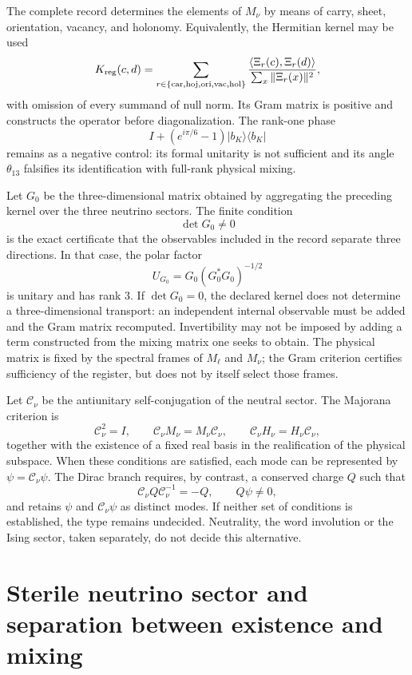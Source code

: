 The complete record determines the elements of \(M_\nu\) by means of carry,
sheet, orientation, vacancy, and holonomy. Equivalently, the
Hermitian kernel may be used
\[
 K_{\rm reg}(c,d)
 =\sum_{r\in\{\rm car,hoj,ori,vac,hol\}}
 \frac{\langle\Xi_r(c),\Xi_r(d)\rangle}
      {\sum_x\|\Xi_r(x)\|^2},
\]
with omission of every summand of null norm. Its Gram matrix is positive and
constructs the operator before diagonalization. The rank-one phase
\[
 I+(e^{i\pi/6}-1)|b_K\rangle\langle b_K|
\]
remains as a negative control: its formal unitarity is not sufficient and its angle
\(\theta_{13}\) falsifies its identification with full-rank physical
mixing.

Let \(G_0\) be the three-dimensional matrix obtained by aggregating the preceding kernel
over the three neutrino sectors. The finite condition
\[
 \det G_0\ne0
\]
is the exact certificate that the observables included in the record
separate three directions. In that case, the polar factor
\[
 U_{G_0}=G_0(G_0^*G_0)^{-1/2}
\]
is unitary and has rank \(3\). If \(\det G_0=0\), the declared kernel does not
determine a three-dimensional transport: an independent internal observable
must be added and the Gram matrix recomputed. Invertibility may not be
imposed by adding a term constructed from the mixing matrix one seeks to obtain.
The physical matrix is fixed by the spectral frames of \(M_\ell\) and
\(M_\nu\); the Gram criterion certifies sufficiency of the register, but does not
by itself select those frames.

Let \(\mathcal C_\nu\) be the antiunitary self-conjugation of the neutral sector. The
Majorana criterion is
\[
 \mathcal C_\nu^2=I,
 \qquad
 \mathcal C_\nu M_\nu=M_\nu\mathcal C_\nu,
 \qquad
 \mathcal C_\nu H_\nu=H_\nu\mathcal C_\nu,
\]
together with the existence of a fixed real basis in the realification of the
physical subspace. When these conditions are satisfied, each mode can be
represented by \(\psi=\mathcal C_\nu\psi\). The Dirac branch requires, by
contrast, a conserved charge \(Q\) such that
\[
 \mathcal C_\nu Q\mathcal C_\nu^{-1}=-Q,
 \qquad Q\psi\ne0,
\]
and retains \(\psi\) and \(\mathcal C_\nu\psi\) as distinct modes. If neither
set of conditions is established, the type remains undecided.
Neutrality, the word involution or the Ising sector, taken
separately, do not decide this alternative.

\section{Sterile neutrino sector and separation between existence and mixing}

